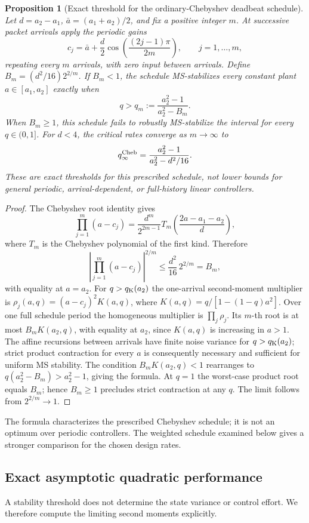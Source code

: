 \documentclass[preprint,12pt,numbers]{elsarticle}
\newtheorem{proposition}{Proposition}
\theoremstyle{definition}
\begin{document}
\begin{proposition}[Exact threshold for the ordinary-Chebyshev deadbeat schedule]\label{prop:cheb-periodic}
Let $d=a_2-a_1$, $\bar a=(a_1+a_2)/2$, and fix a positive integer $m$. At successive packet arrivals apply the periodic gains
\[
 c_j=\bar a+\frac d2\cos\left(\frac{(2j-1)\pi}{2m}\right),\qquad j=1,\ldots,m,
\]
repeating every $m$ arrivals, with zero input between arrivals. Define $B_m=(d^2/16)2^{2/m}$. If $B_m<1$, the schedule MS-stabilizes every constant plant $a\in[a_1,a_2]$ exactly when
\[
 q>q_m:=\frac{a_2^2-1}{a_2^2-B_m}.
\]
When $B_m\ge 1$, this schedule fails to robustly MS-stabilize the interval for every $q\in(0,1]$. For $d<4$, the critical rates converge as $m\to\infty$ to
\[
 q_\infty^{\rm Cheb}=\frac{a_2^2-1}{a_2^2-d^2/16}.
\]
These are exact thresholds \emph{for this prescribed schedule}, not lower bounds for general periodic, arrival-dependent, or full-history linear controllers.
\end{proposition}
\begin{proof}
The Chebyshev root identity gives
\[
 \prod_{j=1}^m(a-c_j)=\frac{d^m}{2^{2m-1}}
 T_m\!\left(\frac{2a-a_1-a_2}{d}\right),
\]
where $T_m$ is the Chebyshev polynomial of the first kind. Therefore
\[
 \left|\prod_{j=1}^m(a-c_j)\right|^{2/m}
 \le \frac{d^2}{16}\,2^{2/m}=B_m,
\]
with equality at $a=a_2$. For $q>q_{\rm K}(a_2)$ the one-arrival second-moment multiplier is
$\rho_j(a,q)=(a-c_j)^2 K(a,q)$, where
$K(a,q)=q/[1-(1-q)a^2]$. Over one full schedule period the homogeneous multiplier is
$\prod_j\rho_j$. Its $m$-th root is at most $B_m K(a_2,q)$, with equality at $a_2$, since $K(a,q)$ is increasing in $a>1$. The affine recursions between arrivals have finite noise variance for $q>q_{\rm K}(a_2)$; strict product contraction for every $a$ is consequently necessary and sufficient for uniform MS stability. The condition $B_m K(a_2,q)<1$ rearranges to $q(a_2^2-B_m)>a_2^2-1$, giving the formula. At $q=1$ the worst-case product root equals $B_m$; hence $B_m\ge1$ precludes strict contraction at any $q$. The limit follows from $2^{2/m}\to1$.
\end{proof}
The formula characterizes the prescribed Chebyshev schedule; it is not an optimum over periodic controllers. The weighted schedule examined below gives a stronger comparison for the chosen design rates.



\subsection{Exact asymptotic quadratic performance}
A stability threshold does not determine the state variance or control effort. We therefore compute the limiting second moments explicitly.
\end{document}
